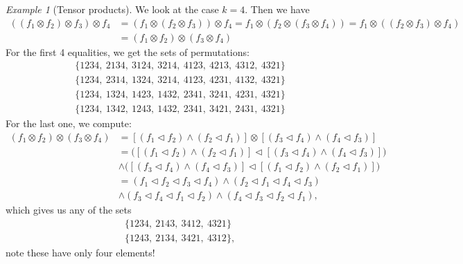 \documentclass[12pt]{article}
\theoremstyle{definition}
\theoremstyle{remark}
\newtheorem{exm}{Example}
\def\vtl{\vartriangleleft}
\begin{document}
\begin{exm}[Tensor products]
We look at the case $k=4$. Then we have 
\begin{align*}
((f_1\otimes f_2)\otimes f_3)\otimes f_4&=(f_1\otimes (f_2\otimes f_3))\otimes f_4=
f_1\otimes (f_2\otimes (f_3\otimes f_4))=f_1\otimes ((f_2\otimes f_3)\otimes f_4)\\
&=(f_1\otimes f_2)\otimes (f_3\otimes f_4)
\end{align*}
For the first 4 equalities, we get the sets of permutations:
\begin{align*}
\{1234,\ 2134,\ 3124,\ 3214,\ 4123,\ 4213,\ 4312,\ 4321\}\\
\{1234,\ 2314,\ 1324,\ 3214,\ 4123,\ 4231,\ 4132,\ 4321\}\\
\{1234,\ 1324,\ 1423,\ 1432,\ 2341,\ 3241,\ 4231,\ 4321\}\\
\{1234,\ 1342,\ 1243,\ 1432,\ 2341,\ 3421,\ 2431,\ 4321\}
\end{align*}
For the last one, we compute:
\begin{align*}
(f_1\otimes f_2)\otimes (f_3\otimes f_4)&=[(f_1\vtl f_2)\wedge (f_2\vtl f_1)]\otimes
[(f_3\vtl f_4)\wedge (f_4\vtl f_3)]\\
&=\biggl([(f_1\vtl f_2)\wedge (f_2\vtl f_1)]\vtl [(f_3\vtl f_4)\wedge (f_4\vtl
f_3)]\biggr)\\ &\wedge \biggl([(f_3\vtl f_4)\wedge (f_4\vtl
f_3)]\vtl [(f_1\vtl f_2)\wedge (f_2\vtl f_1)]\biggr)\\
&=(f_1\vtl f_2\vtl f_3\vtl f_4)\wedge (f_2\vtl f_1\vtl f_4\vtl f_3)\\
&\wedge (f_3\vtl f_4\vtl f_1\vtl f_2)\wedge (f_4\vtl f_3\vtl f_2\vtl f_1), 
\end{align*}
which gives us any of the sets
\begin{align*}
\{1234,\ 2143,\ 3412,\ 4321\}\\
\{1243,\ 2134,\ 3421,\ 4312\},
\end{align*}
note these have only four elements!

\end{exm}
\end{document}

